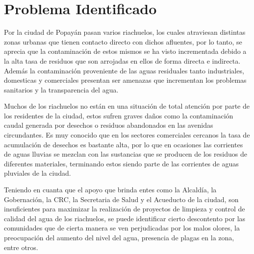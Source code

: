\section{Problema Identificado}
Por la ciudad de Popayán pasan varios riachuelos, los cuales atraviesan distintas zonas urbanas que tienen contacto directo con dichos afluentes, por lo tanto, se aprecia que la contaminación de estos mismos se ha visto incrementada debido a la alta tasa de residuos que son arrojadas en ellos de forma directa e indirecta. Además la contaminación proveniente de las aguas residuales tanto industriales, domesticas y comerciales presentan ser amenazas que incrementan los problemas sanitarios y la transparencia del agua.

Muchos de los riachuelos no están en una situación de total atención por parte de los residentes de la ciudad, estos sufren graves daños como la contaminación caudal generada por desechos o residuos abandonados en las avenidas circundantes. Es muy conocido que en los sectores comerciales cercanos la tasa de acumulación de desechos es bastante alta, por lo que en ocasiones las corrientes de aguas lluvias se mezclan con las sustancias que se producen de los residuos de diferentes materiales, terminando estos siendo parte de las corrientes de aguas pluviales de la ciudad.

Teniendo en cuanta que el apoyo que brinda entes como la Alcaldía, la Gobernación, la CRC, la Secretaria de Salud y el Acueducto de la ciudad, son insuficientes para maximizar la realización de proyectos de limpieza y control de calidad del agua de los riachuelos, se puede identificar cierto descontento por las comunidades que de cierta manera se ven perjudicadas por los malos olores, la preocupación del aumento del nivel del agua, presencia de plagas en la zona, entre otros.
